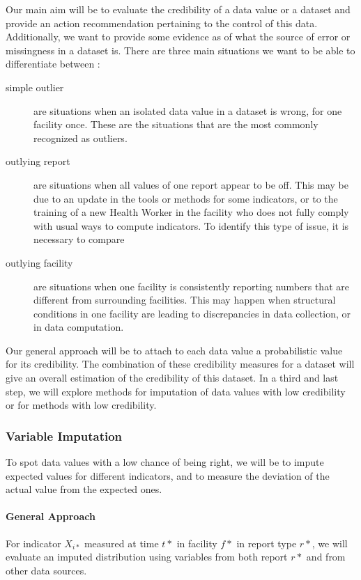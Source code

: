 Our main aim will be to evaluate the credibility of a data value or a dataset and provide an action recommendation pertaining to the control of this data.  Additionally, we want to provide some evidence as of what the source of error or missingness in a dataset is. There are three main situations we want to be able to differentiate between :
\begin{description}
	\item[simple outlier] are situations when an isolated data value in a dataset is wrong, for one facility once. These are the situations that are the most commonly recognized as outliers.
	\item[outlying report] are situations when all values of one report appear to be off. This may be due to an update in the tools or methods for some indicators, or to the training of a new Health Worker in the facility who does not fully comply with usual ways to compute indicators. To identify this type of issue, it is necessary to compare
	\item[outlying facility] are situations when one facility is consistently reporting numbers that are different from surrounding facilities. This may happen when structural conditions in one facility are leading to discrepancies in data collection, or in data computation.
\end{description}

Our general approach will be to attach to each data value a probabilistic value for its credibility. The combination of these credibility measures for a dataset will give an overall estimation of the credibility of this dataset. In a third and last step, we will explore methods for imputation of data values with low credibility or for methods with low credibility.



\subsubsection{Variable Imputation}

To spot data values with a low chance of being right, we  will be to impute expected values for different indicators, and to measure the deviation of the actual value from the expected ones.

\paragraph{General Approach} For indicator $X_{i*}$ measured at time $t*$ in facility $f*$ in report type $r*$, we will evaluate an imputed distribution using variables from both report $r*$ and from other data sources.

